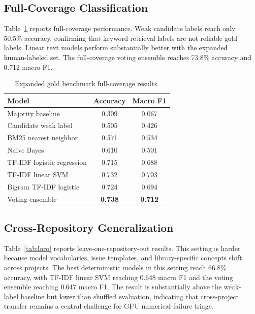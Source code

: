\documentclass[conference]{IEEEtran}
\begin{document}
\subsection{Full-Coverage Classification}

Table~\ref{tab:fullcoverage} reports full-coverage performance. Weak candidate
labels reach only 50.5\% accuracy, confirming that keyword retrieval labels
are not reliable gold labels. Linear text models perform substantially better
with the expanded human-labeled set. The full-coverage voting ensemble reaches
73.8\% accuracy and 0.712 macro F1.

\begin{table}[t]
\centering
\caption{Expanded gold benchmark full-coverage results.}
\label{tab:fullcoverage}
\begin{tabular}{lcc}
\toprule
Model & Accuracy & Macro F1 \\
\midrule
Majority baseline & 0.309 & 0.067 \\
Candidate weak label & 0.505 & 0.426 \\
BM25 nearest neighbor & 0.571 & 0.534 \\
Naive Bayes & 0.610 & 0.501 \\
TF-IDF logistic regression & 0.715 & 0.688 \\
TF-IDF linear SVM & 0.732 & 0.703 \\
Bigram TF-IDF logistic & 0.724 & 0.694 \\
Voting ensemble & \textbf{0.738} & \textbf{0.712} \\
\bottomrule
\end{tabular}
\end{table}

\subsection{Cross-Repository Generalization}

Table~\ref{tab:loro} reports leave-one-repository-out results. This setting is
harder because model vocabularies, issue templates, and library-specific
concepts shift across projects. The best deterministic models in this setting
reach 66.8\% accuracy, with TF-IDF linear SVM reaching 0.648 macro F1 and the
voting ensemble reaching 0.647 macro F1. The result is substantially above the
weak-label baseline but lower than shuffled evaluation, indicating that
cross-project transfer remains a central challenge for GPU numerical-failure
triage.
\end{document}
